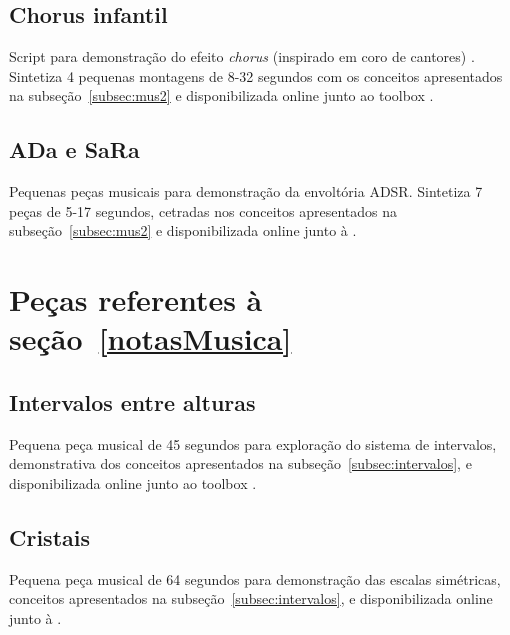 \clearpage

\subsection{Chorus infantil}\label{ap:chorus}
Script para demonstração do efeito \emph{chorus} (inspirado em coro de cantores) . Sintetiza 4 pequenas montagens de 8-32 segundos com os conceitos apresentados na subseção~\ref{subsec:mus2} e disponibilizada online junto ao toolbox \massa.\cite{MASSA}


\clearpage

\subsection{ADa e SaRa}\label{ap:ada}
Pequenas peças musicais para demonstração da envoltória ADSR. Sintetiza 7 peças de 5-17 segundos, cetradas nos conceitos apresentados na subseção~\ref{subsec:mus2} e disponibilizada online junto à \massa.\cite{MASSA}


\clearpage

\section{Peças referentes à seção~\ref{notasMusica}}
\subsection{Intervalos entre alturas}\label{ap:intervalos}
Pequena peça musical de 45 segundos para exploração do sistema de intervalos, demonstrativa dos conceitos apresentados na subseção~\ref{subsec:intervalos}, e disponibilizada online junto ao toolbox \massa.

\clearpage

\subsection{Cristais}\label{ap:cristais}
Pequena peça musical de 64 segundos para demonstração das escalas simétricas, conceitos apresentados na subseção~\ref{subsec:intervalos}, e disponibilizada online junto à \massa.\cite{MASSA}


\clearpage

